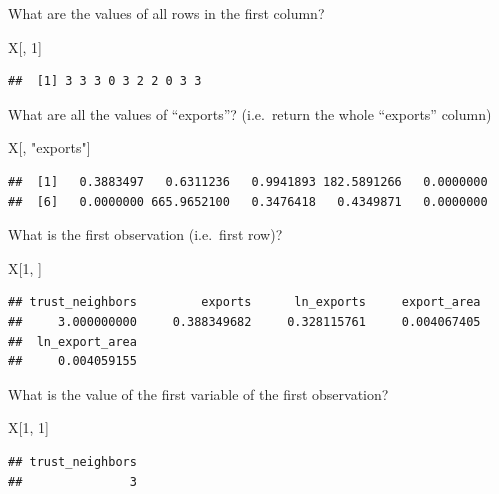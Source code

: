 \documentclass[]{book}
\newenvironment{Shaded}{\begin{snugshade}}{\end{snugshade}}
\newcommand{\DecValTok}[1]{\textcolor[rgb]{0.00,0.00,0.81}{#1}}
\newcommand{\StringTok}[1]{\textcolor[rgb]{0.31,0.60,0.02}{#1}}
\newcommand{\NormalTok}[1]{#1}
\theoremstyle{definition}
\theoremstyle{definition}
\theoremstyle{definition}
\theoremstyle{remark}
\begin{document}
What are the values of all rows in the first column?

\begin{Shaded}
\begin{Highlighting}[]
\NormalTok{X[, }\DecValTok{1}\NormalTok{]}
\end{Highlighting}
\end{Shaded}

\begin{verbatim}
##  [1] 3 3 3 0 3 2 2 0 3 3
\end{verbatim}

What are all the values of ``exports''? (i.e.~return the whole
``exports'' column)

\begin{Shaded}
\begin{Highlighting}[]
\NormalTok{X[, }\StringTok{"exports"}\NormalTok{]}
\end{Highlighting}
\end{Shaded}

\begin{verbatim}
##  [1]   0.3883497   0.6311236   0.9941893 182.5891266   0.0000000
##  [6]   0.0000000 665.9652100   0.3476418   0.4349871   0.0000000
\end{verbatim}

What is the first observation (i.e.~first row)?

\begin{Shaded}
\begin{Highlighting}[]
\NormalTok{X[}\DecValTok{1}\NormalTok{, ]}
\end{Highlighting}
\end{Shaded}

\begin{verbatim}
## trust_neighbors         exports      ln_exports     export_area 
##     3.000000000     0.388349682     0.328115761     0.004067405 
##  ln_export_area 
##     0.004059155
\end{verbatim}

What is the value of the first variable of the first observation?

\begin{Shaded}
\begin{Highlighting}[]
\NormalTok{X[}\DecValTok{1}\NormalTok{, }\DecValTok{1}\NormalTok{]}
\end{Highlighting}
\end{Shaded}

\begin{verbatim}
## trust_neighbors 
##               3
\end{verbatim}
\end{document}
